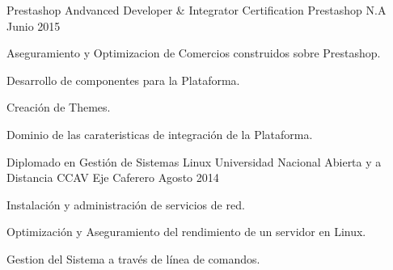 

\begin{cventries}

  \cventry
    {Prestashop Andvanced Developer \& Integrator Certification} %
    {Prestashop} %
    {N.A} %
    {Junio 2015} %
    {
      \begin{cvitems} %
        \item {Aseguramiento y Optimizacion de Comercios construidos sobre Prestashop.}
        \item {Desarrollo de componentes para la Plataforma.}
        \item {Creación de Themes.}
        \item {Dominio de las carateristicas de integración de la Plataforma.}
      \end{cvitems}
    }

  \cventry
    {Diplomado en Gestión de Sistemas Linux} %
    {Universidad Nacional Abierta y a Distancia} %
    {CCAV Eje Caferero} %
    {Agosto 2014} %
    {
      \begin{cvitems} %
        \item {Instalación y administración de servicios de red.}
        \item {Optimización y Aseguramiento del rendimiento de un servidor en Linux.}
        \item {Gestion del Sistema a través de línea de comandos.}        
      \end{cvitems}
    }

\end{cventries}
